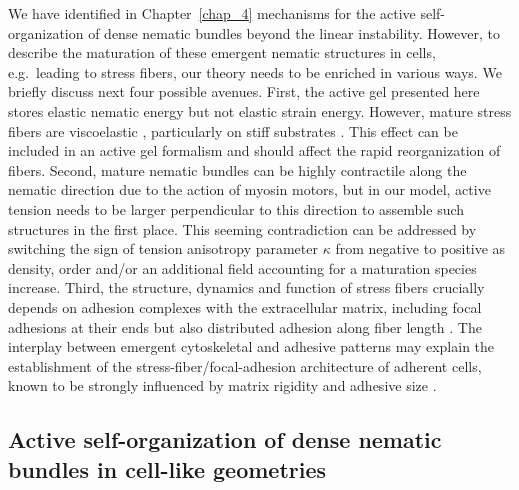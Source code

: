 		We have identified in Chapter~\ref{chap_4} mechanisms for the active self-organization of dense nematic bundles beyond the linear instability.  However, to describe the maturation of these emergent nematic structures in cells, e.g.~leading to stress fibers, our theory needs to be enriched in various ways. We briefly discuss next four possible avenues. First, the active gel presented here stores elastic nematic energy but not elastic strain energy. However, mature stress fibers are viscoelastic \cite{KUMAR20063762,doi:10.1091/mbc.E18-02-0106}, particularly on stiff substrates \cite{gupta2015}. This effect can be included in an active gel formalism \cite{Prost:2015aa} and should affect the rapid reorganization of fibers. Second, mature nematic bundles can be highly contractile along the nematic direction due to the action of myosin motors, but in our model, active tension needs to be larger perpendicular to this direction to assemble such structures in the first place. This seeming contradiction can be addressed by switching the sign of tension anisotropy parameter $\kappa$ from negative to positive as density, order and/or an additional field accounting for a maturation species increase. Third, the structure, dynamics and function of stress fibers crucially depends on adhesion complexes with the extracellular matrix, including focal adhesions at their ends but also distributed adhesion along fiber length \cite{10.1242/jcs.042986}. The interplay between emergent cytoskeletal and adhesive patterns \cite{doi:10.1098/rsif.2007.1182} may explain the establishment of the stress-fiber/focal-adhesion architecture of adherent cells, known to be strongly influenced by matrix rigidity \cite{Zemel:2010aa,gupta2015} and adhesive size \cite{jalal2019}.

\subsection*{Active self-organization of dense nematic bundles in cell-like geometries}

